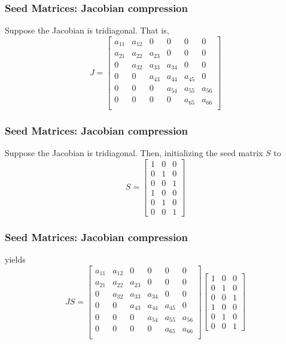 \documentclass[compact,12pt]{beamer}
\begin{document}
\begin{frame}
\large\frametitle{Seed Matrices: Jacobian compression}
Suppose the Jacobian is tridiagonal. That is,
$$
J = \left[ \begin{array}{cccccc}
     a_{11} & a_{12} & 0 & 0 & 0 & 0\\
     a_{21} & a_{22} & a_{23} & 0 & 0 & 0\\
     0 & a_{32} & a_{33} & a_{34} & 0 & 0\\
     0 & 0 & a_{43} & a_{44} & a_{45} & 0\\
     0 & 0 & 0 & a_{54} & a_{55} & a_{56}\\
     0 & 0 & 0 & 0 & a_{65} & a_{66}\\
\end{array}\right]
$$
\end{frame}

\begin{frame}
\large\frametitle{Seed Matrices: Jacobian compression}
Suppose the Jacobian is tridiagonal. Then, initializing the seed matrix $S$ to
$$
S = \left[ \begin{array}{ccc}
1 & 0 & 0 \\
0 & 1 & 0 \\
0 & 0 & 1 \\
1 & 0 & 0 \\
0 & 1 & 0 \\
0 & 0 & 1 
\end{array}\right]
$$
\end{frame}

\begin{frame}
\large\frametitle{Seed Matrices: Jacobian compression}
yields
$$
JS =
\left[ \begin{array}{cccccc}
     a_{11} & a_{12} & 0 & 0 & 0 & 0\\
     a_{21} & a_{22} & a_{23} & 0 & 0 & 0\\
     0 & a_{32} & a_{33} & a_{34} & 0 & 0\\
     0 & 0 & a_{43} & a_{44} & a_{45} & 0\\
     0 & 0 & 0 & a_{54} & a_{55} & a_{56}\\
     0 & 0 & 0 & 0 & a_{65} & a_{66}\\
\end{array}\right]
\left[ \begin{array}{ccc}
1 & 0 & 0 \\
0 & 1 & 0 \\
0 & 0 & 1 \\
1 & 0 & 0 \\
0 & 1 & 0 \\
0 & 0 & 1 
\end{array}\right]
$$
\end{frame}
\end{document}
